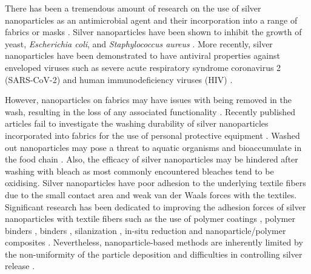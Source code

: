 \documentclass[10pt,letterpaper]{article}
\begin{document}

There has been a tremendous amount of research on the use of silver nanoparticles as an antimicrobial agent \cite{lansdown:06,Rai:09}
 and their incorporation into 
a range of 
fabrics or masks \cite{bu_fabrication_2019,perera_morphological_2013, lvm:10, zhong_plasmonic_2020,tremiliosi_ag_2020,abulikemu:2022,huang:2022}.
Silver nanoparticles have been shown to inhibit the growth of yeast, \textit{Escherichia coli}, and \textit{Staphylococcus aureus} \cite{Kim:07mar}. %
More recently, silver nanoparticles have been demonstrated to have antiviral properties against enveloped viruses such as severe acute respiratory syndrome coronavirus 2 (SARS-CoV-2) and human immunodeficiency viruses (HIV) \cite{jeremiah_potent_2020,lara_2010,elechiguerra_interaction_2005,ahmed:2021}. %

However, nanoparticles on fabrics may have issues with being removed in the wash, resulting in the loss of any associated functionality \cite{Lorenz:12,Impellitteri:09}. Recently published articles fail to investigate the washing durability of silver nanoparticles incorporated into fabrics for the use of personal protective equipment \cite{abulikemu:2022,zhong_plasmonic_2020}.
Washed out nanoparticles 
may pose a threat to aquatic organisms \cite{Krysanov:10,Ma:13_nanoparticle,Fabrega:11,Pillai:14}
and bioaccumulate in the food chain \cite{Uddin:20}.
Also, the efficacy of silver nanoparticles may be hindered after washing with bleach as most commonly encountered bleaches tend to be oxidising\cite{lansdown:06,Impellitteri:09}. 
Silver nanoparticles 
have poor adhesion to the underlying textile fibers due to the small contact area and weak van der Waals forces with the textiles.  Significant research has been dedicated to improving the adhesion forces of silver nanoparticles with textile fibers
such as the use of polymer coatings 
\cite{dastjerdi:2009}, 
polymer binders \cite{Zhang:13feb}, 
binders \cite{Zhou:18,abulikemu:2022}, silanization \cite{shen:2019}, in-situ reduction \cite{huang:2022} and nanoparticle/polymer composites \cite{Zahran:14}.
Nevertheless, nanoparticle-based methods
are inherently limited by the non-uniformity of the particle deposition and difficulties in controlling silver release \cite{geranio:2009,mitrano:2014}.
\end{document}
